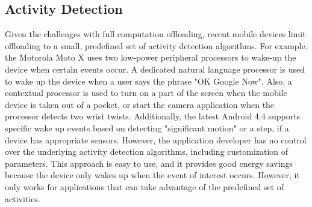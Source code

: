 
\subsection{Activity Detection}

Given the challenges with full computation offloading, recent mobile devices
limit offloading to a small, predefined set of activity detection
algorithms. For example, the Motorola Moto X uses two low-power peripheral
processors to wake-up the device when certain events occur. A dedicated natural
language processor is used to wake up the device when a user says the phrase "OK
Google Now". Also, a contextual processor is used to turn on a part of the
screen when the mobile device is taken out of a pocket, or start the camera
application when the processor detects two wrist twists. Additionally, the
latest Android 4.4 supports specific wake up events based on detecting
"significant motion" or a step, if a device has appropriate sensors. However,
the application developer has no control over the underlying activity detection
algorithms, including customization of parameters. This approach is easy to use,
and it provides good energy savings because the device only wakes up when the
event of interest occurs. However, it only works for applications that can take
advantage of the predefined set of activities.





